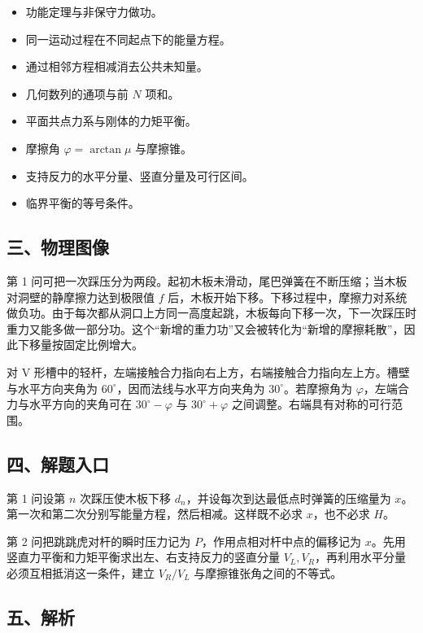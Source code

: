\documentclass[12pt,a4paper,UTF8]{ctexart}
\newcommand{\tightlist}{\setlength{\itemsep}{0pt}\setlength{\parskip}{0pt}}
\begin{document}
\begin{itemize}
\tightlist
\item
  功能定理与非保守力做功。
\item
  同一运动过程在不同起点下的能量方程。
\item
  通过相邻方程相减消去公共未知量。
\item
  几何数列的通项与前 \(N\) 项和。
\item
  平面共点力系与刚体的力矩平衡。
\item
  摩擦角 \(\varphi=\arctan\mu\) 与摩擦锥。
\item
  支持反力的水平分量、竖直分量及可行区间。
\item
  临界平衡的等号条件。
\end{itemize}

\subsection{三、物理图像}\label{ux4e09ux7269ux7406ux56feux50cf}

第 1
问可把一次踩压分为两段。起初木板未滑动，尾巴弹簧在不断压缩；当木板对洞壁的静摩擦力达到极限值
\(f\)
后，木板开始下移。下移过程中，摩擦力对系统做负功。由于每次都从洞口上方同一高度起跳，木板每向下移一次，下一次踩压时重力又能多做一部分功。这个``新增的重力功''又会被转化为``新增的摩擦耗散''，因此下移量按固定比例增大。

对 V
形槽中的轻杆，左端接触合力指向右上方，右端接触合力指向左上方。槽壁与水平方向夹角为
\(60^\circ\)，因而法线与水平方向夹角为 \(30^\circ\)。若摩擦角为
\(\varphi\)，左端合力与水平方向的夹角可在 \(30^\circ-\varphi\) 与
\(30^\circ+\varphi\) 之间调整。右端具有对称的可行范围。

\subsection{四、解题入口}\label{ux56dbux89e3ux9898ux5165ux53e3}

第 1 问设第 \(n\) 次踩压使木板下移
\(d_n\)，并设每次到达最低点时弹簧的压缩量为
\(x\)。第一次和第二次分别写能量方程，然后相减。这样既不必求
\(x\)，也不必求 \(H\)。

第 2 问把跳跳虎对杆的瞬时压力记为 \(P\)，作用点相对杆中点的偏移记为
\(x\)。先用竖直力平衡和力矩平衡求出左、右支持反力的竖直分量
\(V_L,V_R\)，再利用水平分量必须互相抵消这一条件，建立 \(V_R/V_L\)
与摩擦锥张角之间的不等式。

\subsection{五、解析}\label{ux4e94ux89e3ux6790}
\end{document}
